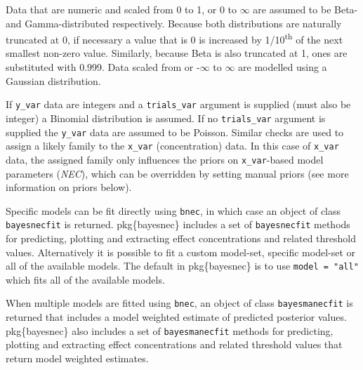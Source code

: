 \documentclass[
]{jss}
\begin{document}
Data that are numeric and scaled from 0 to 1, or 0 to \(\infty\) are
assumed to be Beta- and Gamma-distributed respectively. Because both
distributions are naturally truncated at 0, if necessary a value that is
0 is increased by 1/10\textsuperscript{th} of the next smallest non-zero
value. Similarly, because Beta is also truncated at 1, ones are
substituted with 0.999. Data scaled from or -\(\infty\) to \(\infty\)
are modelled using a Gaussian distribution.

If \texttt{y\_var} data are integers and a \texttt{trials\_var} argument
is supplied (must also be integer) a Binomial distribution is assumed.
If no \texttt{trials\_var} argument is supplied the \texttt{y\_var} data
are assumed to be Poisson. Similar checks are used to assign a likely
family to the \texttt{x\_var} (concentration) data. In this case of
\texttt{x\_var} data, the assigned family only influences the priors on
\texttt{x\_var}-based model parameters (\emph{NEC}), which can be
overridden by setting manual priors (see more information on priors
below).

Specific models can be fit directly using \texttt{bnec}, in which case
an object of class \texttt{bayesnecfit} is returned. pkg\{bayesnec\}
includes a set of \texttt{bayesnecfit} methods for predicting, plotting
and extracting effect concentrations and related threshold values.
Alternatively it is possible to fit a custom model-set, specific
model-set or all of the available models. The default in pkg\{bayesnec\}
is to use \texttt{model\ =\ "all"} which fits all of the available
models.

When multiple models are fitted using \texttt{bnec}, an object of class
\texttt{bayesmanecfit} is returned that includes a model weighted
estimate of predicted posterior values. pkg\{bayesnec\} also includes a
set of \texttt{bayesmanecfit} methods for predicting, plotting and
extracting effect concentrations and related threshold values that
return model weighted estimates.
\end{document}
